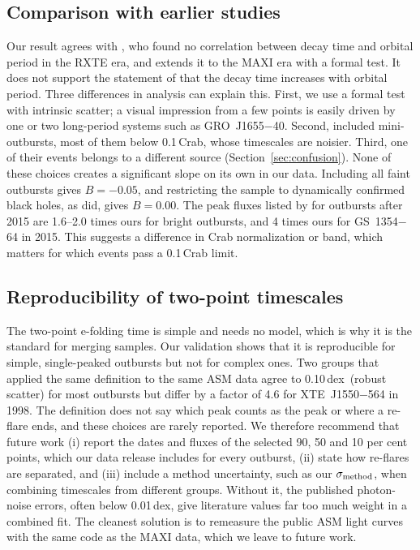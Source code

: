 \documentclass[fleqn,usenatbib]{mnras}
\newcommand{\dex}{\,dex}
\begin{document}
\subsection{Comparison with earlier studies}
\label{sec:compare}

Our result agrees with \citet{YanYu2015}, who found no correlation between decay time and orbital period in the RXTE era, and extends it to the MAXI era with a formal test. It does not support the statement of \citet{Saraswati2025} that the decay time increases with orbital period. Three differences in analysis can explain this. First, we use a formal test with intrinsic scatter; a visual impression from a few points is easily driven by one or two long-period systems such as GRO~J1655$-$40. Second, \citet{Saraswati2025} included mini-outbursts, most of them below 0.1\,Crab, whose timescales are noisier. Third, one of their events belongs to a different source (Section~\ref{sec:confusion}). None of these choices creates a significant slope on its own in our data. Including all faint outbursts gives $B=-0.05$, and restricting the sample to dynamically confirmed black holes, as \citet{Saraswati2025} did, gives $B=0.00$. The peak fluxes listed by \citet{Saraswati2025} for outbursts after 2015 are 1.6--2.0 times ours for bright outbursts, and 4 times ours for GS~1354$-$64 in 2015. This suggests a difference in Crab normalization or band, which matters for which events pass a 0.1\,Crab limit.

\subsection{Reproducibility of two-point timescales}
\label{sec:repro}

The two-point e-folding time is simple and needs no model, which is why it is the standard for merging samples. Our validation shows that it is reproducible for simple, single-peaked outbursts but not for complex ones. Two groups that applied the same definition to the same ASM data agree to 0.10\dex\ (robust scatter) for most outbursts but differ by a factor of 4.6 for XTE~J1550$-$564 in 1998. The definition does not say which peak counts as the peak or where a re-flare ends, and these choices are rarely reported. We therefore recommend that future work (i) report the dates and fluxes of the selected 90, 50 and 10 per cent points, which our data release includes for every outburst, (ii) state how re-flares are separated, and (iii) include a method uncertainty, such as our $\sigma_{\rm method}$, when combining timescales from different groups. Without it, the published photon-noise errors, often below 0.01\dex, give literature values far too much weight in a combined fit. The cleanest solution is to remeasure the public ASM light curves with the same code as the MAXI data, which we leave to future work.
\end{document}
